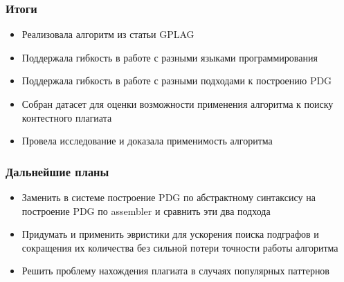 \documentclass[10pt]{beamer}
\begin{document}
\begin{frame}\frametitle{Итоги}
	\begin{itemize}
		\item Реализовала алгоритм из статьи GPLAG
		\item Поддержала гибкость в работе с разными языками программирования
		\item Поддержала гибкость в работе с разными подходами к построению PDG
		\item Собран датасет для оценки возможности применения алгоритма к поиску контестного плагиата
		\item Провела исследование и доказала применимость алгоритма
	\end{itemize}
\end{frame}

\begin{frame}\frametitle{Дальнейшие планы}
    \begin{itemize}
        \item Заменить в системе построение PDG по абстрактному синтаксису на построение PDG по assembler и сравнить эти два подхода
        \item Придумать и применить эвристики для ускорения поиска подграфов и сокращения их количества без сильной потери точности работы алгоритма
        \item Решить проблему нахождения плагиата в случаях популярных паттернов
        
    \end{itemize}
\end{frame}
\end{document}
